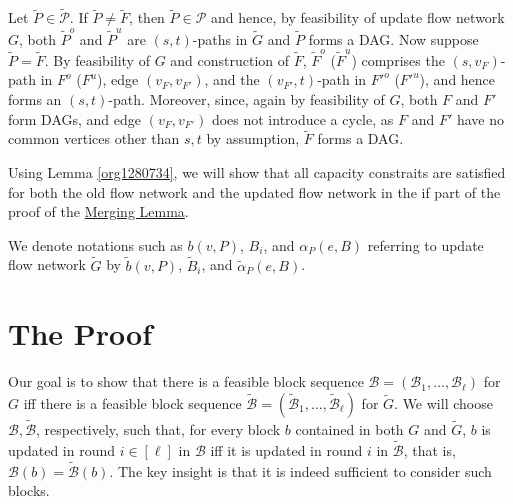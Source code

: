 \documentclass[fontsize=11pt,paper=a4]{book}
\begin{document}
Let \(\tilde{P}\in\tilde{\mathcal{P}}\).
If \(\tilde{P}\neq\tilde{F}\), then \(\tilde{P}\in\mathcal{P}\) and hence, by feasibility of update flow network \(G\), both \(\tilde{P}^o\) and \(\tilde{P}^u\) are \((s,t)\)-paths in \(\tilde{G}\) and \(\tilde{P}\) forms a DAG.
Now suppose \(\tilde{P}=\tilde{F}\).
By feasibility of \(G\) and construction of \(\tilde{F}\), \(\tilde{F}^o\) (\(\tilde{F}^u\)) comprises the \((s,v_F)\)-path in \(F^o\) (\(F^u\)), edge \((v_F,v_{F'})\), and the \((v_{F'},t)\)-path in \(F'^o\) (\(F'^u\)), and hence forms an \((s,t)\)-path.
Moreover, since, again by feasibility of \(G\), both \(F\) and \(F'\) form DAGs, and edge \((v_F,v_{F'})\) does not introduce a cycle, as \(F\) and \(F'\) have no common vertices other than \(s,t\) by assumption, \(\tilde{F}\) forms a DAG.

Using Lemma \ref{org1280734}, we will show that all capacity constraits are satisfied for both the old flow network and the updated flow network in the if part of the proof of the \hyperref[orgce7cb77]{Merging Lemma}.

We denote notations such as \(b(v,P)\), \(B_i\), and \(\alpha_P(e,B)\) referring to update flow network \(\tilde{G}\) by \(\tilde{b}(v,P)\), \(\tilde{B}_i\), and \(\tilde{\alpha}_P(e,B)\).

\section{The Proof}
\label{sec:orgfa6a21b}

Our goal is to show that there is a feasible block sequence \(\mathcal{B}=(\mathscr{B}_1,\dots,\mathscr{B}_{\ell})\) for \(G\) iff there is a feasible block sequence \(\tilde{\mathcal{B}}=(\tilde{\mathscr{B}}_1,\dots,\tilde{\mathscr{B}}_{\ell})\) for \(\tilde{G}\).
We will choose \(\mathcal{B},\tilde{\mathcal{B}}\), respectively, such that, for every block \(b\) contained in both \(G\) and \(\tilde{G}\), \(b\) is updated in round \(i\in[\ell]\) in \(\mathcal{B}\) iff it is updated in round \(i\) in \(\tilde{\mathcal{B}}\), that is, \(\mathcal{B}(b)=\tilde{\mathcal{B}}(b)\).
The key insight is that it is indeed sufficient to consider such blocks.
\end{document}
